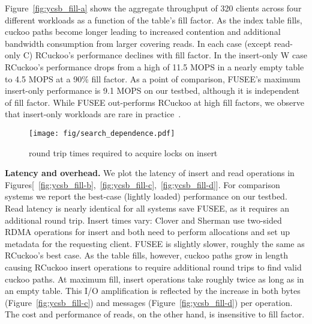 Figure~\ref{fig:ycsb_fill-a} shows the aggregate throughput of 320
clients across four different workloads as a function of the table's
fill factor.  As the index table fills, cuckoo paths become longer
leading to increased contention and additional bandwidth consumption
from larger covering reads. In each case (except read-only C)
RCuckoo's performance declines with fill factor. In the insert-only
W case RCuckoo's performance drops from a high of 11.5 MOPS in a
nearly empty table to 4.5 MOPS at a 90\% fill factor.  As a point of
comparison, FUSEE's maximum insert-only performance is 9.1 MOPS on our
testbed, although it is independent of fill factor.  While FUSEE
out-performs RCuckoo at high fill factors, we observe that 
insert-only workloads are rare in
practice~\cite{facebook-memcached}.

\begin{figure}
\centering
        \texttt{[image: fig/search\_dependence.pdf]}
\caption{round trip times required to acquire locks on insert}
             \label{fig:microbenchmarks-b}
\end{figure}


\textbf{Latency and overhead.} We plot
the latency of insert and read operations in
Figures[~\ref{fig:ycsb_fill-b},~\ref{fig:ycsb_fill-c},~\ref{fig:ycsb_fill-d}].  For comparison
systems we report the best-case (lightly loaded) performance on our testbed.  Read latency is nearly
identical for all systems save FUSEE, as it requires an additional round trip. Insert times vary:
Clover and Sherman use two-sided RDMA operations for insert and both need to perform allocations and
set up metadata for the requesting client.  FUSEE is slightly slower, roughly the same as RCuckoo's
best case.  As the table fills, however, cuckoo paths grow in length causing RCuckoo insert
operations to require additional round trips to find valid cuckoo paths.  At maximum fill, insert
operations take roughly twice as long as in an empty table. This I/O amplification is reflected by
the increase in both bytes (Figure~\ref{fig:ycsb_fill-c}) and messages
(Figure~\ref{fig:ycsb_fill-d}) per operation.  The cost and performance of reads, on the other hand,
is insensitive to fill factor.



